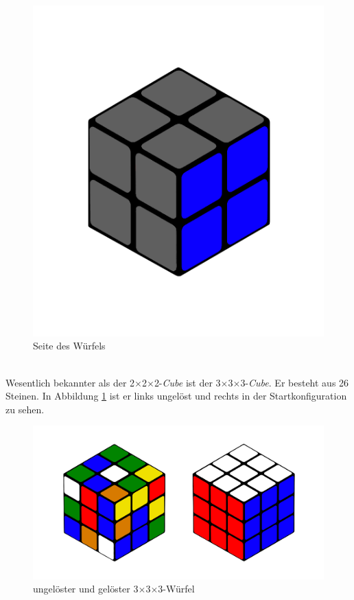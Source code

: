 \documentclass[12pt,a4paper, usenames, dvipsnames]{article}
\theoremstyle{mystyle}
\theoremstyle{definition}
\newcommand{\Ttwo}{2$\times$2$\times$2-}
\newcommand{\Tthree}{3$\times$3$\times$3-}
\begin{document}
\begin{description}
\begin{figure}[h]
\centering
\includegraphics[scale=0.1]{2x2seite.png}
\caption[Seite des Würfels]{Seite des Würfels}
\end{figure}


\item[\Tthree Würfel] \ \\
Wesentlich bekannter als der \Ttwo \textit{Cube} ist der \Tthree \textit{Cube}. Er besteht aus 26 Steinen. In Abbildung \ref{Abbildung_3erWürfel} ist er links ungelöst und rechts in der Startkonfiguration zu sehen.

\begin{figure}[h]
\centering
\includegraphics[scale=0.11]{3x3_sc_so.png}
\caption[Ungelöster und gelöster \Tthree Würfel]{ungelöster und gelöster \Tthree Würfel}
\label{Abbildung_3erWürfel}
\end{figure}


\end{description}
\end{document}
